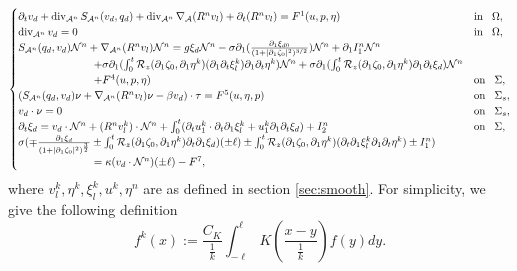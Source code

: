 \documentclass[letterpaper,reqno,10pt,twoside]{amsart}
\theoremstyle{definition}
\theoremstyle{remark}
\def\p{\partial}
\def\dive{\mathop{\rm div}\nolimits}
\begin{document}
\begin{appendix}
			\begin{equation}
				\begin{cases}
					\partial_{t}v_{d}+\operatorname{div}_{\mathcal{A}^{n}}S_{\mathcal{A}^{n}}(v_{d},q_{d})+\dive_{\mathcal{A}^{n}}\nabla_{\mathcal{A}}(R^{n}v_{l})+\p_{t}(R^{n}v_{l})=F^{1}(u,p,\eta)~~~&\operatorname{in}~~\Omega,\\
					\operatorname{div}_{\mathcal{A}^{n}}v_{d}=0~~~&\operatorname{in}~~\Omega,\\
					S_{\mathcal{A}^{n}}(q_{d},v_{d})\mathcal{N}^{n}+\nabla_{\mathcal{A}^{n}}(R^{n}v_{l})\mathcal{N}^{n}=g\xi_{d}\mathcal{N}^{n}-\sigma\partial_{1}(\frac{\p_1\xi_{d0}}{(1+\vert \partial_{1}\zeta_{0}\vert^{2})^{3/2}})\mathcal{N}^{n}+\p_{1}I_{1}^{n}\mathcal{N}^{n}\\
					\quad\quad\quad\quad\quad\quad\quad+\sigma\partial_{1}(\int_{0}^{t}\mathcal{R}_{z}(\partial_{1}\zeta_{0},\partial_{1}\eta^{k})(\partial_{1}\p_{t}\xi_{l}^{k})\p_{1}\p_{t}\eta^{k})\mathcal{N}^{n}+\sigma\partial_{1}(\int_{0}^{t}\mathcal{R}_{z}(\partial_{1}\zeta_{0},\partial_{1}\eta^{k})\partial_{1}\partial_{t}\xi_{d})\mathcal{N}^{n}\\
					\quad\quad\quad\quad\quad\quad\quad+F^{4}(u,p,\eta)~~~&\operatorname{on}~~\Sigma,\\
					(S_{\mathcal{A}^{n}}(q_{d},v_{d})\nu+\nabla_{\mathcal{A}^{n}}(R^{n}v_{l})\nu-\beta v_{d})\cdot \tau=F^{5}(u,\eta,p)~~~&\operatorname{on}~~\Sigma_{s},\\
					v_{d}\cdot \nu=0~~~&\operatorname{on}~~\Sigma_{s},\\
					\partial_{t}\xi_{d}=v_{d}\cdot \mathcal{N}^{n}+(R^{n}v_{l}^{k})\cdot \mathcal{N}^{n}+\int_{0}^{t}(\partial_{t}u_{1}^{k}\cdot\partial_{t}\p_{1}\xi_{l}^{k}+u_{1}^{k}\partial_{1}\partial_{t}\xi_{d})+I_{2}^{n}~~~&\operatorname{on}~~\Sigma,\\
					\sigma(\mp \frac{\partial_{1}\xi_{d}}{(1+\vert \partial_{1}\zeta_{0}\vert^{2})^{\frac{3}{2}}}\pm \int_{0}^{t}\mathcal{R}_{z}(\partial_{1}\zeta_{0},\partial_{1}\eta^{k})\partial_{t}\partial_{1}\xi_{d})(\pm \ell)\pm\int_{0}^{t}\mathcal{R}_{z}(\p_{1}\zeta_{0},\p_{1}\eta^{k})(\p_{t}\p_{1}\xi_{l}^{k}\p_{1}\p_{t}\eta^{k})\pm I_{1}^{n})\\
					\quad\quad\quad\quad\quad\quad\quad=\kappa (v_{d}\cdot \mathcal{N}^{n})(\pm \ell)-{F}^{7},
				\end{cases}
			\end{equation}
			where $v_{l}^{k},\eta^{k},\xi_{l}^{k},u^{k},\eta^{n}$ are as defined in section \ref{sec:smooth}. For simplicity, we give the following definition
			\[
			f^{k}(x):=\frac{C_{K}}{\frac{1}{k}}\int_{-\ell}^{\ell}K(\frac{x-y}{\frac{1}{k}})f(y)dy.
			\]
			

\end{appendix}
\end{document}
